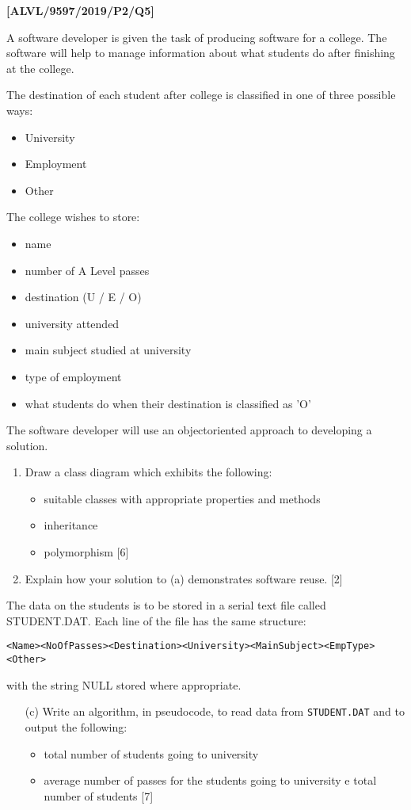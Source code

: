\item \textbf{{[}ALVL/9597/2019/P2/Q5{]} }

A software developer is given the task of producing software for a
college. The software will help to manage information about what students
do after finishing at the college.

The destination of each student after college is classified in one
of three possible ways:
\begin{itemize}
\item University
\item Employment 
\item Other
\end{itemize}
The college wishes to store:
\begin{itemize}
\item name 
\item number of A Level passes 
\item destination (U / E / O) 
\item university attended 
\item main subject studied at university 
\item type of employment 
\item what students do when their destination is classified as 'O'
\end{itemize}
The software developer will use an objectoriented approach to developing
a solution.
\begin{enumerate}
\item Draw a class diagram which exhibits the following:
\begin{itemize}
\item suitable classes with appropriate properties and methods 
\item inheritance 
\item polymorphism \hfill{}{[}6{]}
\end{itemize}
\item Explain how your solution to (a) demonstrates software reuse.\hfill{}
{[}2{]}
\end{enumerate}
The data on the students is to be stored in a serial text file called
STUDENT.DAT. Each line of the file has the same structure:

\texttt{<Name><NoOfPasses><Destination><University><MainSubject><EmpType><Other>}

with the string NULL stored where appropriate.
\begin{enumerate}
\item[(c)]  Write an algorithm, in pseudocode, to read data from \texttt{STUDENT.DAT}
and to output the following:
\begin{itemize}
\item total number of students going to university 
\item average number of passes for the students going to university e total
number of students\hfill{} {[}7{]}
\end{itemize}
\end{enumerate}